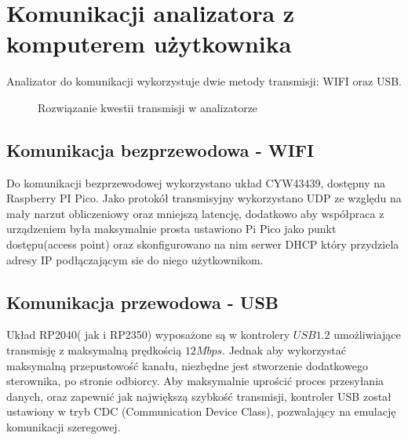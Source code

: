 \section{Komunikacji analizatora z komputerem użytkownika}
Analizator do komunikacji wykorzystuje dwie metody transmisji: WIFI oraz USB.

\begin{figure}[ht]
    \centering
    \caption{Rozwiązanie kwestii transmisji w analizatorze}
    \label{fig:udp-komunikacja}
\end{figure}

\subsection{Komunikacja bezprzewodowa - WIFI}
    Do komunikacji bezprzewodowej wykorzystano układ CYW43439, dostępny na Raspberry PI Pico. 
    Jako protokół transmisyjny wykorzystano UDP ze względu na mały narzut
    obliczeniowy oraz mniejszą latencję, dodatkowo aby współpraca z urządzeniem była maksymalnie prosta ustawiono Pi Pico
    jako punkt dostępu(access point) oraz skonfigurowano na nim serwer DHCP który przydziela adresy
    IP podłączającym sie do niego użytkownikom. 

\subsection{Komunikacja przewodowa - USB}
    Układ RP2040( jak i RP2350) wyposażone są w kontrolery $USB 1.2$ umożliwiające transmisję z maksymalną prędkością $12Mbps$.
    Jednak aby wykorzystać maksymalną przepustowość kanału, niezbędne jest stworzenie dodatkowego sterownika, po stronie odbiorcy.
    Aby maksymalnie uprościć proces przesyłania danych, oraz zapewnić jak największą szybkość transmisji, kontroler USB został ustawiony w tryb CDC (Communication Device Class),
    pozwalający na emulację komunikacji szeregowej.

